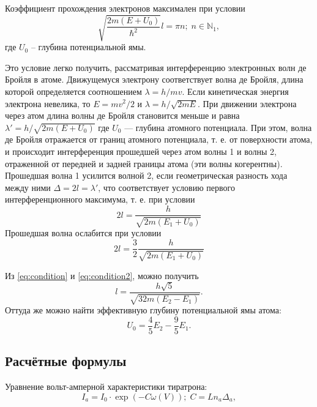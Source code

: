 \documentclass[a4paper,12pt]{extarticle}
\begin{document}
Коэффициент прохождения электронов максимален при условии
\begin{equation}\label{eq:at}
	\sqrt{\frac{2 m (E+U_0)}{\hbar^2}}l = \pi n;\; n \in \mathbb{N}_1,
\end{equation}
где $ U_0 $ -- глубина потенциальной ямы.

Это условие легко получить, рассматривая интерференцию электронных волн де Бройля в атоме. Движущемуся электрону соответствует волна де Бройля, длина которой определяется соотношением $ \lambda = h/m v $. Если кинетическая энергия электрона невелика, то $ E = m v^2/2 $ и $ \lambda = h/\sqrt{2 m E} $. При движении электрона через атом длина волны де Бройля становится меньше и равна $ \lambda' = h/\sqrt{2 m (E+U_0)} $ где $ U_0 $ — глубина атомного потенциала. При этом, волна де Бройля отражается от границ атомного потенциала, т. е. от поверхности атома, и происходит интерференция прошедшей через атом волны 1 и волны 2, отраженной от передней и задней границы атома (эти волны когерентны). Прошедшая волна 1 усилится волной 2, если геометрическая разность хода между ними $ \Delta = 2 l = \lambda' $, что соответствует условию первого интерференционного максимума, т. е. при условии
\begin{equation}\label{eq:condition}
	2 l = \frac{h}{\sqrt{2 m (E_1 + U_0)}}
\end{equation}
Прошедшая волна ослабится при условии
\begin{equation}\label{eq:condition2}
	2 l = \frac{3}{2}\frac{h}{\sqrt{2 m (E_1 + U_0)}}
\end{equation}

Из \eqref{eq:condition} и \eqref{eq:condition2}, можно получить
\begin{equation}\label{eq:radius}
	l = \frac{h \sqrt{5}}{\sqrt{32 m (E_2-E_1)}}.
\end{equation}
Оттуда же можно найти эффективную глубину потенциальной ямы атома:
\begin{equation}\label{eq:atomPit}
	U_0 = \frac{4}{5}E_2-\frac{9}{5} E_1.
\end{equation}

\subsection*{Расчётные формулы}

Уравнение вольт-амперной характеристики тиратрона:
\begin{equation}\label{eq:VAH}
	I_a = I_0 \cdot \exp(-C \omega (V));\; C = L n_a \Delta_a,
\end{equation}
\end{document}

